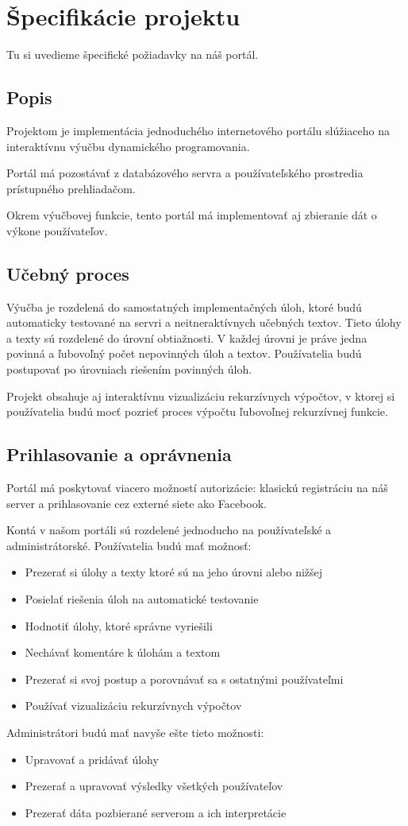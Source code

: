 \chapter{Špecifikácie projektu}
Tu si uvedieme špecifické požiadavky na náš portál.

\section{Popis}
Projektom je implementácia jednoduchého internetového portálu slúžiaceho na interaktívnu výučbu
dynamického programovania.

Portál má pozostávať z databázového servra a používateľského prostredia
prístupného prehliadačom.

Okrem výučbovej funkcie, tento portál má implementovať aj zbieranie dát
o výkone používateľov.
\section{Učebný proces}
Výučba je rozdelená do samostatných implementačných úloh, ktoré budú automaticky
testované na servri a neitneraktívnych učebných textov. Tieto úlohy a texty sú rozdelené do úrovní obtiažnosti.
V každej úrovni je práve jedna povinná a ľubovoľný počet nepovinných úloh a textov.
Používatelia budú postupovať po úrovniach riešením povinných úloh.

Projekt obsahuje aj interaktívnu vizualizáciu rekurzívnych výpočtov,
v ktorej si používatelia budú mocť pozrieť proces výpočtu ľubovoľnej rekurzívnej funkcie.

\section{Prihlasovanie a oprávnenia}
Portál má poskytovať viacero možností autorizácie: klasickú registráciu
na náš server a prihlasovanie cez externé siete ako Facebook.

Kontá v našom portáli sú rozdelené jednoducho na používateľské a administrátorské.
\newpage
Používatelia budú mať možnosť:
\begin{itemize}
  \item Prezerať si úlohy a texty ktoré sú na jeho úrovni alebo nižšej
  \item Posielať riešenia úloh na automatické testovanie
  \item Hodnotiť úlohy, ktoré správne vyriešili
  \item Nechávať komentáre k úlohám a textom
  \item Prezerať si svoj postup a porovnávať sa s ostatnými používateľmi
  \item Používať vizualizáciu rekurzívnych výpočtov
\end{itemize}
Administrátori budú mať navyše ešte tieto možnosti:
\begin{itemize}
  \item Upravovať a pridávať úlohy
  \item Prezerať a upravovať výsledky všetkých používateľov
  \item Prezerať dáta pozbierané serverom a ich interpretácie
\end{itemize}
